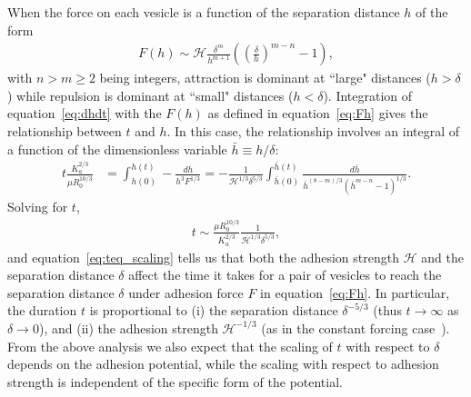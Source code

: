 \documentclass[prf,superscriptaddress,showpacs]{revtex4-1}
\begin{document}
When the force on each vesicle is a function of the separation distance
$h$ of the form
\begin{align}
  \label{eq:Fh}
  F(h) \sim \mathcal{H} \frac{\delta^m}{h^{m+1}}
    \left(\left(\frac{\delta}{h}\right)^{m-n}-1\right),
\end{align}
with $n>m\ge 2$ being integers, attraction is dominant at ``large"
distances ($h > \delta$) while repulsion is dominant at ``small"
distances ($h<\delta$).  Integration of equation~\eqref{eq:dhdt} with
the $F(h)$ as defined in equation~\eqref{eq:Fh} gives the relationship
between $t$ and $h$.  In this case, the relationship involves an
integral of a function of the dimensionless variable $\bar{h} \equiv
h/\delta$:
\begin{align*}
  t\frac{K_a^{2/3}}{\mu R_0^{10/3}}& = 
    \int^{h(t)}_{h(0)}-\frac{dh}{h^3 F^{1/3}} = 
    -\frac{1}{\mathcal{H}^{1/3}\delta^{5/3}}\int^{\bar{h}(t)}_{\bar{h}(0)}
      \frac{d \bar{h}}{\bar{h}^{(8-m)/3}(\bar{h}^{m-n}-1)^{1/3}}.
\end{align*}
Solving for $t$,
\begin{align}
\label{eq:teq_scaling}
  t\sim \frac{\mu R_0^{10/3}}{K_a^{2/3}}\frac{1}{\mathcal{H}^{1/3}\delta^{5/3}},
\end{align}
and equation~\eqref{eq:teq_scaling} tells us that both the adhesion
strength $\mathcal{H}$ and the separation distance $\delta$ affect the
time it takes for a pair of vesicles to reach the separation distance
$\delta$ under adhesion force $F$ in equation~\eqref{eq:Fh}.  In
particular, the duration $t$ is proportional to (i) the separation
distance $\delta^{-5/3}$ (thus $t\rightarrow \infty$ as
$\delta\rightarrow 0$), and (ii) the adhesion strength
$\mathcal{H}^{-1/3}$ (as in the constant forcing
case~\cite{RamachandranLeal2010_PoF}).  From the above analysis we also
expect that the scaling of $t$ with respect to $\delta$ depends on the
adhesion potential, while the scaling with respect to adhesion strength
is independent of the specific form of the potential.
\end{document}
